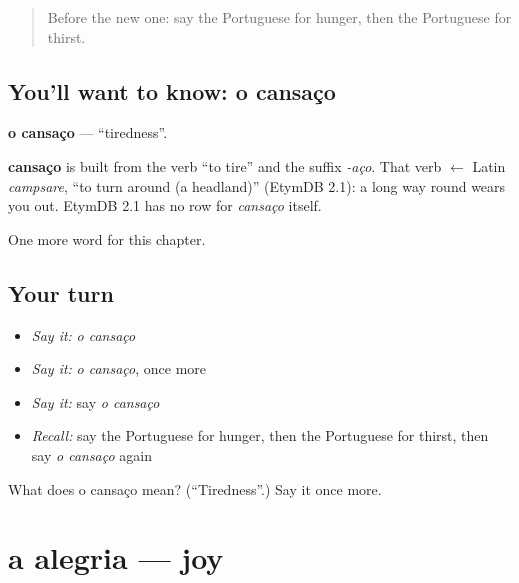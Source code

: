 \label{lesson:PT-C35-cansaco}



\begin{quote}
Before the new one: say the Portuguese for hunger, then the Portuguese for thirst.
\end{quote}

\subsection*{You'll want to know: o cansaço}
\textbf{o cansaço} — \textquotedblleft{}tiredness\textquotedblright{}.

\begin{cousinweb}
\textbf{cansaço} is built from the verb \textquotedblleft{}to tire\textquotedblright{} and the suffix \emph{-aço}. That verb $\leftarrow$ Latin \emph{campsare}, \textquotedblleft{}to turn around (a headland)\textquotedblright{} (EtymDB 2.1): a long way round wears you out. EtymDB 2.1 has no row for \emph{cansaço} itself.
\end{cousinweb}

\begin{grammarlens}[title={What you've built}]
One more word for this chapter.
\end{grammarlens}

\subsection*{Your turn}
\begin{itemize}
\raggedright
  \item \emph{Say it:} \emph{o cansaço}
  \item \emph{Say it:} \emph{o cansaço}, once more
  \item \emph{Say it:} say \emph{o cansaço}
  \item \emph{Recall:} say the Portuguese for hunger, then the Portuguese for thirst, then say \emph{o cansaço} again
\end{itemize}

\begin{tcolorbox}[breakable,colback=teal!4,colframe=teal!35!black,title={Before you move on}]
What does o cansaço mean? (\textquotedblleft{}Tiredness\textquotedblright{}.) Say it once more.
\end{tcolorbox}
\section[a alegria]{a alegria — joy}

